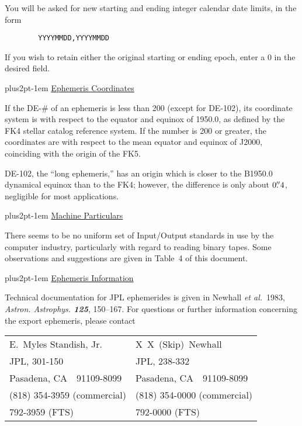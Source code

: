 \documentclass[twoside,11pt]{article}
\renewcommand{\_}{\texttt{\symbol{95}}}
\newcommand{\hdg}[1]{\vskip4pt plus2pt\leavevmode\kern-1em \underline{\large{#1}}\par}
\newcommand{\hdg}[1]{\subsection*{{#1}}}
\begin{document}
You will be asked for new starting and ending integer
calendar date limits, in the form
\begin{verbatim}
        YYYYMMDD,YYYYMMDD
\end{verbatim}
If you wish to retain either the original starting or ending epoch,
enter a 0 in the desired field.

\hdg{Ephemeris Coordinates}

If the DE-\# of an ephemeris is less than 200 (except for DE-102),
its coordinate
system is with respect to the equator and equinox of 1950.0, as
defined by the FK4 stellar catalog reference system. If the number
is 200 or greater, the coordinates are with respect to the mean
equator and equinox of J2000, coinciding with the origin of the FK5.

DE-102, the ``long ephemeris,'' has an origin which is closer
to the B1950.0 dynamical equinox than to the FK4; however, the
difference is only about $0.\kern-3pt''4$, negligible for
most applications.

\hdg{Machine Particulars}

There seems to be no uniform set of Input/Output standards in use by
the computer industry, particularly with regard to reading
binary tapes. Some observations and suggestions are given in Table~4 of
this document.

\hdg{Ephemeris Information}

Technical documentation for JPL ephemerides is given in
Newhall \textit{et al.}~1983, \textit{Astron. Astrophys. \textbf{125}},
150--167.
For questions or further information concerning the export
ephemeris, please contact

\begin{center}
\begin{tabular}{ll}
E.~Myles Standish, Jr.         & X~X~(Skip)~Newhall \\
JPL, 301-150                   & JPL, 238-332 \\
Pasadena, CA\ \ 91109-8099     & Pasadena, CA\ \ 91109-8099 \\
(818) 354-3959 (commercial)    & (818) 354-0000 (commercial) \\
\phantom{(818)} 792-3959 (FTS) & \phantom{(818)} 792-0000 (FTS)
\end{tabular}
\end{center}

\end{document}
